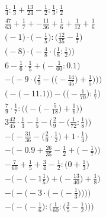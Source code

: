 \documentclass[8pt]{article}
\begin{document}
\begin{align}
\frac{1}{4} : \frac{1}{3} + \frac{13}{24} - \frac{1}{2} : \frac{1}{3} : \frac{1}{2} \\
\frac{47}{63} + \frac{1}{7} + -\frac{11}{36} + \frac{1}{6} + \frac{1}{12} + \frac{1}{6} \\
\big(-1\big) \cdot \big(-\frac{1}{5}\big) : \big(\frac{12}{35} - \frac{1}{7}\big) \\
\Big(-8\Big) \cdot \Big(-\frac{4}{8} \cdot \big(\frac{1}{8} : \frac{1}{2}\big)\Big) \\
6 - \frac{1}{6} \cdot \frac{1}{5} + \big(-\frac{1}{60} : 0.1\big) \\
-\Bigg(-9 \cdot \bigg(\frac{2}{9} - \Big(\big(-\frac{14}{45}\big) + \frac{1}{5}\Big)\bigg)\Bigg) \\
\Big(-\big(-11.1\big)\Big) - \Big(\big(-\frac{1}{70}\big) : \frac{1}{7}\Big) \\
\frac{7}{9} \cdot \frac{1}{7} : \bigg(\Big(-\big(-\frac{5}{18}\big) + \frac{1}{6}\Big)\bigg) \\
3\frac{42}{45} \cdot \frac{1}{3} - \frac{1}{5} - \Big(\frac{2}{9} - \big(\frac{1}{72} : \frac{1}{8}\big)\Big) \\
-\Big(-\frac{31}{36} - \big(\frac{2}{9} \cdot \frac{1}{2}\big) + 1 \cdot \frac{1}{4}\Big) \\
-\Big(-0.9 + \frac{26}{35} - \frac{1}{2} + \big(-\frac{1}{7}\big)\Big) \\
-\frac{7}{60} + \frac{1}{5} + \frac{3}{4} - \frac{1}{2} : \big(0 + \frac{1}{3}\big) \\
-\Big(-\big(-1\frac{1}{5}\big) + \big(-\frac{13}{40}\big) + \frac{1}{8}\Big) \\
-\Bigg(-\bigg(-3 \cdot \Big(-\big(-\frac{1}{3}\big)\Big)\bigg)\Bigg) \\
-\bigg(-\Big(-\frac{1}{6}\Big) : \Big(\frac{1}{60} : \big(\frac{3}{5} - \frac{1}{2}\big)\Big)\bigg)
\end{align}
\end{document}
